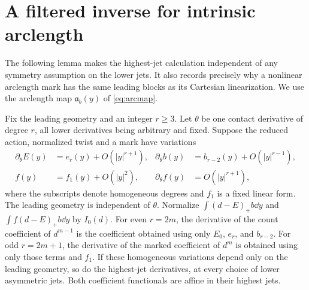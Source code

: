 \section{A filtered inverse for intrinsic arclength}
\label{sec:filtered}
The following lemma makes the highest-jet calculation independent of
any symmetry assumption on the lower jets. It also records precisely
why a nonlinear arclength mark has the same leading blocks as its
Cartesian linearization. We use the arclength map
$\mathfrak a_b(y)$ of \eqref{eq:arcmap}.

\begin{lemma}\label{lem:filter}
Fix the leading geometry and an integer $r\ge3$. Let $\theta$ be one
contact derivative of degree $r$, all lower derivatives being arbitrary
and fixed. Suppose the reduced action, normalized twist and a mark have
variations
\begin{align*}
 \partial_\theta E(y)&=e_r(y)+O(|y|^{r+1}),&
 \partial_\theta b(y)&=b_{r-2}(y)+O(|y|^{r-1}),\\
 f(y)&=f_1(y)+O(|y|^2),&
 \partial_\theta f(y)&=O(|y|^{r+1}),
\end{align*}
where the subscripts denote homogeneous degrees and $f_1$ is a fixed
linear form. The leading geometry is independent of $\theta$. Normalize
$\int(d-E)_+b\dd y$ and $\int f(d-E)_+b\dd y$ by $I_0(d)$.
For even $r=2m$, the derivative of the count coefficient of $d^{m-1}$
is the coefficient obtained using only $E_0$, $e_r$, and $b_{r-2}$.
For odd $r=2m+1$, the derivative of the marked coefficient of $d^m$
is obtained using only those terms and $f_1$.
If these homogeneous variations depend only on the leading geometry,
so do the highest-jet derivatives, at every choice of lower asymmetric
jets. Both coefficient functionals are affine in their highest jets.
\end{lemma}
